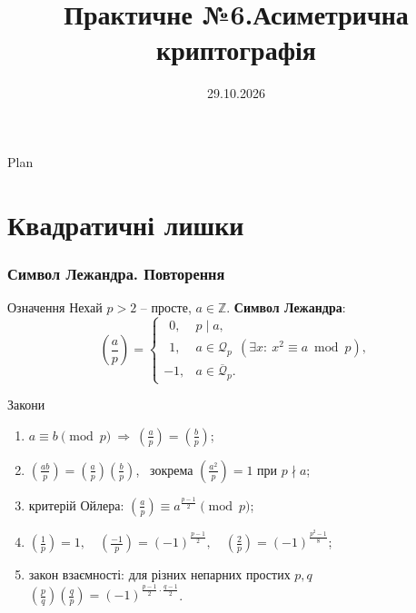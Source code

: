 \documentclass{../zkdl-presentation-template}
\title[Криптографія]{\textbf{Практичне №6.Асиметрична криптографія}}
\date{29.10.2026}
\newcommand{\legendre}[2]{\left(\frac{#1}{#2}\right)}
\begin{document}
    \frame{
        \titlepage
    }

    \begin{frame}{Plan}
        \tableofcontents
    \end{frame}

    \section{Квадратичні лишки} %

\begin{frame}
    \frametitle{Символ Лежандра. Повторення}
    \small
    \begin{block}{Означення}
        Нехай $p>2$ -- просте, $a\in\mathbb{Z}$. \textbf{Символ Лежандра}:
        \vspace{-1mm}
        \begin{equation*}
            \legendre{a}{p}=
            \begin{cases}
                \ \ 0, & p\mid a,\\
                \ \ 1, & a\in\mathcal{Q}_p\ \ (\exists x:\ x^2\equiv a \bmod p),\\
                -1, & a\in\overline{\mathcal{Q}}_p.
            \end{cases}
        \end{equation*}
    \end{block}
    \vspace{-2mm}
    \begin{exampleblock}{Закони}
        \begin{enumerate}[itemsep=2pt]
            \item $a\equiv b \pmod p\ \Rightarrow\ \legendre{a}{p}=\legendre{b}{p}$;
            \item $\legendre{ab}{p}=\legendre{a}{p}\legendre{b}{p}$, \ зокрема $\legendre{a^2}{p}=1$ при $p\nmid a$;
            \item критерій Ойлера: $\legendre{a}{p}\equiv a^{\frac{p-1}{2}} \pmod p$;
            \item $\legendre{1}{p}=1,\quad \legendre{-1}{p}=(-1)^{\frac{p-1}{2}},\quad \legendre{2}{p}=(-1)^{\frac{p^2-1}{8}}$;
            \item закон взаємності: для різних непарних простих $p,q$ \
            $\legendre{p}{q}\legendre{q}{p}=(-1)^{\frac{p-1}{2}\cdot\frac{q-1}{2}}$.
        \end{enumerate}
    \end{exampleblock}
\end{frame}
\end{document}
